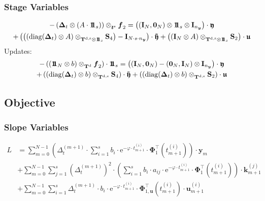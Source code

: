 \documentclass{article}
\newcommand{\tp}{\top}%
\newcommand{\kron}{\otimes}%
\newcommand{\dkron}[2][]{\mathbin{\kron_{#2}^{#1}}}%
\newcommand{\expe}{\mathrm{e}}%
\newcommand{\diag}{\mathop{\mathrm{diag}}}%
\newcommand{\vectorfont}[1]{\boldsymbol{#1}}%
\newcommand{\greekvectorfont}[1]{\boldsymbol{#1}}%
\newcommand{\matrixfont}[1]{\mathbf{#1}}%
\newcommand{\fvec}{\vectorfont{f}}
\newcommand{\kvec}{\vectorfont{k}}
\newcommand{\tvec}{\vectorfont{t}}
\newcommand{\uvec}{\vectorfont{u}}
\newcommand{\yvec}{\vectorfont{y}}
\newcommand{\Deltavec}{\greekvectorfont{\Delta}}
\newcommand{\Phivec}{\greekvectorfont{\Phi}}
\newcommand{\ufrakvec}{\vectorfont{\mathfrak{u}}}
\newcommand{\yfrakvec}{\vectorfont{\mathfrak{y}}}
\newcommand{\tildeyfrakvec}{\vectorfont{\tilde{\mathfrak{y}}}}
\newcommand{\nullvec}{\greekvectorfont{0}}
\newcommand{\einsvec}{\vectorfont{1}\negthinspace\negthinspace\vectorfont{1}} %
\newcommand{\Imat}{\matrixfont{I}}%
\newcommand{\Smat}{\matrixfont{S}}
\newcommand{\Tmat}{\matrixfont{T}}
\begin{document}
\subsubsection*{Stage Variables}
\begin{multline*}
-\left(\Deltavec_t \kron (A \cdot \einsvec_s) \right) \dkron{\tvec^{\mathrm{s}}} \fvec_2
= \left((\Imat_N,\nullvec_N) \kron \einsvec_s \kron \Imat_{n_{\yvec}}  \right) \cdot \yfrakvec
\\
+ \left(\left((\diag(\Deltavec_t) \kron A) \dkron{\Tmat^{\mathrm{d},\mathrm{s}} \kron \einsvec_s} \Smat_4  \right)  -\Imat_{N \cdot s \cdot n_{\yvec}}\right) \cdot \tildeyfrakvec
+\left( (\Imat_N \kron A) \dkron{\Tmat^{\mathrm{d},\mathrm{s}} \kron \einsvec_s} \Smat_2 \right)\cdot \ufrakvec
\end{multline*}
Updates:
\begin{multline*}
- \left( (\einsvec_N \kron  b) \dkron{\Tmat^{\mathrm{d}}} \fvec_2 \right) \cdot \einsvec_s
=
\left((\Imat_N,\nullvec_N)-(\nullvec_N,\Imat_N)\kron \Imat_{n_{\yvec}} \right)\cdot \yfrakvec
\\
+ \left((\diag(\Deltavec_t) \kron b)\dkron{\Tmat^{\mathrm{d},\mathrm{s}}}\Smat_4   \right)\cdot \tildeyfrakvec
+ \left((\diag(\Deltavec_t) \kron b)\dkron{\Tmat^{\mathrm{d},\mathrm{s}}}\Smat_2 \right) \cdot \ufrakvec
\end{multline*}


\subsection*{Objective}
\subsubsection*{Slope Variables}
\begin{align*}
L &=
   \sum_{m=0}^{N-1} \left(\Delta_t^{(m+1)}\cdot \sum_{i=1}^s b_i \cdot \expe^{-\varphi \cdot t_{m+1}^{(i)}}\cdot \Phivec_1^{\tp}(t_{m+1}^{(i)}) \right) \cdot \yvec_{m} \\
 &+ \sum_{m=0}^{N-1} \sum_{j=1}^s (\Delta_t^{(m+1)})^2 \cdot \left(\sum_{i=1}^s b_i \cdot a_{ij} \cdot \expe^{-\varphi \cdot t_{m+1}^{(i)}} \cdot \Phivec_1^{\tp} (t_{m+1}^{(i)}) \right) \cdot \kvec_{m+1}^{(j)} \\
 &+ \sum_{m=0}^{N-1} \sum_{i=1}^s \Delta_t^{(m+1)}\cdot b_i \cdot \expe^{-\varphi \cdot t_{m+1}^{(i)}} \cdot \Phivec_{1,\uvec}^{\tp} (t_{m+1}^{(i)})\cdot \uvec_{m+1}^{(i)}
\end{align*}
\end{document}

